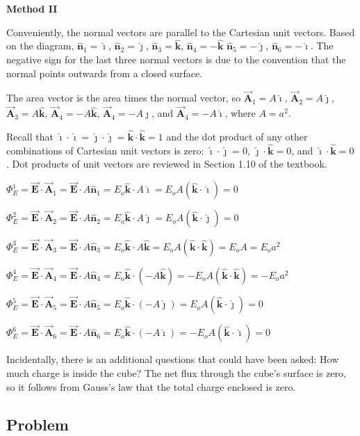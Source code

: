 \documentclass{article}
\newcommand{\ihat}[0]{\hat{\boldsymbol{\imath}}}
\newcommand{\jhat}[0]{\hat{\boldsymbol{\jmath}}}
\newcommand{\khat}[0]{\hat{\boldsymbol{k}}}
\newcommand{\bfvec}[1]{\vec{\mathbf{#1}}}
\begin{document}
\textbf{Method II}

Conveniently, the normal vectors are parallel to the Cartesian unit vectors. Based on the diagram, $\hat{\mathbf{n}}_1=\ihat$, $\hat{\mathbf{n}}_2=\jhat$, $\hat{\mathbf{n}}_3=\khat$, $\hat{\mathbf{n}}_4=-\khat$
$\hat{\mathbf{n}}_5=-\jhat$, $\hat{\mathbf{n}}_6=-\ihat$. The negative sign for the last three normal vectors is due to the convention that the normal points outwards from a closed surface.

The area vector is the area times the normal vector, so $\bfvec{A}_1=A\ihat$, $\bfvec{A}_2=A\jhat$, $\bfvec{A}_3=A\khat$, $\bfvec{A}_4=-A\khat$, $\bfvec{A}_4=-A\jhat$, and $\bfvec{A}_4=-A\ihat$, where $A=a^2$.

Recall that $\ihat\cdot\ihat=\jhat\cdot\jhat=\khat\cdot\khat=1$ and the dot product of any other combinations of Cartesian unit vectors is zero: $\ihat\cdot\jhat=0$, $\jhat\cdot\khat=0$, and $\ihat\cdot\khat=0$. Dot products of unit vectors are reviewed in Section 1.10 of the textbook.

$\Phi_E^{1}=\bfvec{E}\cdot \bfvec{A}_1=\bfvec{E}\cdot A\hat{\mathbf{n}}_1=E_o\khat\cdot A\ihat=E_oA(\khat\cdot \ihat)=0$

$\Phi_E^{2}=\bfvec{E}\cdot \bfvec{A}_2=\bfvec{E}\cdot A\hat{\mathbf{n}}_2=E_o\hat{\mathbf{k}}\cdot A\jhat=E_oA(\khat\cdot \jhat)=0$

$\Phi_E^{3}=\bfvec{E}\cdot \bfvec{A}_3=\bfvec{E}\cdot A\hat{\mathbf{n}}_3=E_o\hat{\mathbf{k}}\cdot A\khat=E_oA(\khat\cdot\khat)=E_oA=E_oa^2$

$\Phi_E^{4}=\bfvec{E}\cdot \bfvec{A}_4=\bfvec{E}\cdot A\hat{\mathbf{n}}_4=E_o\hat{\mathbf{k}}\cdot (-A\khat)=-E_oA(\khat\cdot\khat)=-E_oa^2$

$\Phi_E^{5}=\bfvec{E}\cdot \bfvec{A}_5=\bfvec{E}\cdot A\hat{\mathbf{n}}_5=E_o\hat{\mathbf{k}}\cdot (-A\jhat)=E_oA(\khat\cdot\jhat)=0$

$\Phi_E^{6}=\bfvec{E}\cdot \bfvec{A}_6=\bfvec{E}\cdot A\hat{\mathbf{n}}_6=E_o\hat{\mathbf{k}}\cdot (-A\ihat)=-E_oA(\khat\cdot\ihat)=0$

Incidentally, there is an additional questions that could have been asked: How much charge is inside the cube? The net flux through the cube's surface is zero, so it follows from Gauss's law that the total charge enclosed is zero.

\newpage

\subsection{Problem}
\end{document}
